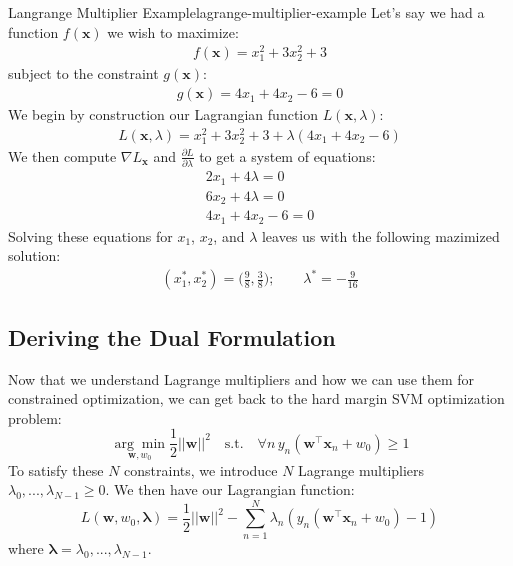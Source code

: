 \begin{example}{Langrange Multiplier Example}{lagrange-multiplier-example}
	Let's say we had a function $f(\textbf{x})$ we wish to maximize:
	\begin{align*}
		f(\textbf{x}) = x_{1}^{2} + 3x_{2}^{2} + 3
	\end{align*}
	subject to the constraint $g(\textbf{x})$:
	\begin{align*}
		g(\textbf{x}) = 4x_{1} + 4x_{2} - 6 = 0
	\end{align*}
	We begin by construction our Lagrangian function $L(\textbf{x}, \lambda)$:
	\begin{align*}
		L(\textbf{x}, \lambda) = x_{1}^{2} + 3x_{2}^{2} + 3 + \lambda (4x_{1} + 4x_{2} - 6)
	\end{align*}
	We then compute $\nabla L_{\textbf{x}}$ and $\frac{\partial L}{\partial \lambda}$ to get a system of equations:
	\begin{align*}
		2x_{1} + 4\lambda = 0 \\
		6x_{2} + 4\lambda = 0 \\
		4x_{1} + 4x_{2} - 6 = 0
	\end{align*}
	Solving these equations for $x_{1}$, $x_{2}$, and $\lambda$ leaves us with the following mazimized solution:
	\begin{align*}
		(x_{1}^{*}, x_{2}^{*}) = \bigg(\frac{9}{8}, \frac{3}{8}\bigg); \qquad \lambda^{*} = -\frac{9}{16}
	\end{align*}
\end{example}

\fi

\subsection{Deriving the Dual Formulation}

Now that we understand Lagrange multipliers and how we can use them for constrained optimization, we can get back to the hard margin SVM optimization problem:
\begin{equation} \label{original-optim-fn}
	\underset{\textbf{w}, w_{0}}{\arg\min} \frac{1}{2} ||\textbf{w}||^{2} \quad \text{s.t.} \quad \forall n \, y_{n}(\textbf{w}^\top\textbf{x}_{n} + w_{0}) \geq 1
\end{equation}
To satisfy these $N$ constraints, we introduce $N$ Lagrange multipliers $\lambda_{0}, ..., \lambda_{N-1} \geq 0$. We then have our Lagrangian function:
\begin{equation} \label{lagrange-equation}
	L(\textbf{w}, w_{0}, \boldsymbol{\lambda}) = \frac{1}{2} ||\textbf{w}||^{2} - \sum_{n=1}^{N} \lambda_{n} (y_{n}(\textbf{w}^\top \textbf{x}_{n} + w_{0}) - 1)
\end{equation}
where $\boldsymbol{\lambda} = \lambda_{0}, ..., \lambda_{N-1}$.

